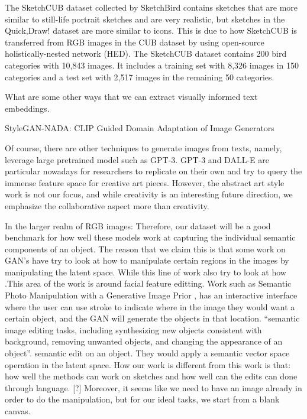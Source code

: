 The SketchCUB dataset collected by SketchBird contains sketches that are more similar to still-life portrait sketches and are very realistic, but sketches in the Quick,Draw! dataset are more similar to icons. This is due to how SketchCUB is transferred from RGB images in the CUB dataset by using open-source holistically-nested network (HED). The SketchCUB dataset contains
200 bird categories with 10,843 images. It includes a training set with 8,326 images in 150 categories and a test set with 2,517 images in the remaining 50 categories.  

What are some other ways that we can extract visually informed text embeddings. 

StyleGAN-NADA: CLIP Guided Domain Adaptation of Image Generators

Of course, there are other techniques to generate images from texts, namely, leverage large pretrained model such as GPT-3. GPT-3 and DALL-E are particular nowadays for researchers to replicate on their own and try to query the immense feature space for creative art pieces. However, the abstract art style work is not our focus, and while creativity is an interesting future direction, we emphasize the collaborative aspect more than creativity. 

In the larger realm of RGB images:
Therefore, our dataset will be a good benchmark for how well these models work at capturing the individual semantic components of an object. The reason that we claim this is that some work on GAN's have try to look at how to manipulate certain regions in the images by manipulating the latent space. While this line of work also try to look at how .This area of the work is around facial feature editting. Work such as Semantic Photo Manipulation with a Generative Image Prior \citep{Bau:Ganpaint:2019}, has an interactive interface where the user can use stroke to indicate where in the image they would want a certain object, and the GAN will generate the objects in that location. ``semantic image editing tasks, including synthesizing new objects consistent with background, removing unwanted objects, and changing the appearance of an object''. semantic edit on an object. They would apply a semantic vector space operation in the latent space. How our work is different from this work is that: how well the methods can work on sketches and how well can the edits can done through language. [?] Moreover, it seems like we need to have an image already in order to do the manipulation, but for our ideal tasks, we start from a blank canvas.

